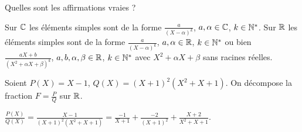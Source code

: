 \begin{question}

Quelles sont les affirmations vraies ?
\begin{answers}



 
\end{answers}
\begin{explanations}
Sur $\mathbb{C}$ les éléments simples sont de la forme $\frac{a}{(X-\alpha)^k}$, $a,\alpha \in \mathbb{C}$, $k\in\mathbb{N}^*$.
Sur $\mathbb{R}$ les éléments simples sont de la forme $\frac{a}{(X-\alpha)^k}$, $a,\alpha \in \mathbb{R}$, $k \in \mathbb{N}^*$ ou bien
$\frac{aX+b}{(X^2+\alpha X+\beta)^k}$, $a,b,\alpha,\beta \in \mathbb{R}$, $k \in \mathbb{N}^*$ avec 
$X^2+\alpha X+\beta$ sans racines réelles.
\end{explanations}
\end{question}


\begin{question}

Soient $P(X)=X-1$, $Q(X)=(X+1)^2(X^2+X+1)$. On décompose la fraction $F = \frac{P}{Q}$ sur $\mathbb{R}$.
\begin{answers}
    
    
    
 
\end{answers}
\begin{explanations}
$\frac{P(X)}{Q(X)} = \frac{X-1}{(X+1)^2(X^2+X+1)}
= \frac{-1}{X+1}+\frac{-2}{(X+1)^2}+\frac{X+2}{X^2+X+1}$.
\end{explanations}
\end{question}



